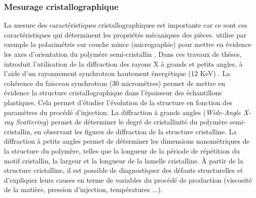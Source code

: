 \subsubsection{Mesurage cristallographique}
La mesure des caractéristiques cristallographiques est importante car ce sont ces caractéristiques qui déterminent les propriétés mécaniques des pièces.
\citeauthor{mendoza_spatial_2003} utilise par exemple la polarimétrie sur couche mince (micrographie) pour mettre en évidence les axes d'orientation du polymère semi-cristallin \cite{mendoza_spatial_2003}.
Dans ces travaux de thèses, \citeauthor{malhab_moulage_2012} introduit l'utilisation de la diffraction des rayons X à grands et petits angles, à l'aide d'un rayonnement synchrotron hautement énergétique (12 KeV) \cite{malhab_moulage_2012}.
La cohérence du faisceau synchrotron (30 micromètres) permet de mettre en évidence la structure cristallographique dans l'épaisseur des échantillons plastiques.
Cela permet d'étudier l'évolution de la structure en fonction des paramètres du procédé d'injection.
La diffraction à grands angles (\textit{Wide-Angle X-ray Scattering}) permet de déterminer le degré de cristallinité du polymère semi-cristallin, en observant les figures de diffraction de la structure cristalline.  %
La diffraction à petits angles permet de déterminer les dimensions nanomètriques de la structure du polymère, telles que la longueur de la période de répétition du motif cristallin, la largeur et la longueur de la lamelle cristalline.
À partir de la structure cristalline, il est possible de diagnostiquer des défauts structurelles et d'expliquer leurs causes en terme de variables du procédé de production (viscosité de la matière, pression d'injection, températures ...).

